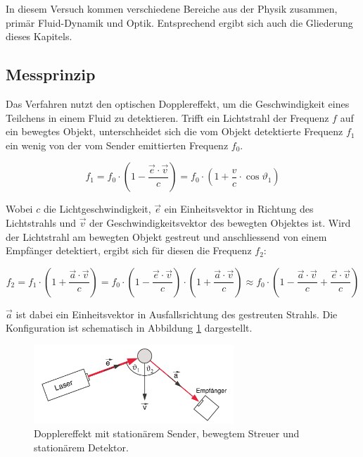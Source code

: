 In  diesem  Versuch kommen  verschiedene  Bereiche  aus der  Physik  zusammen,
prim\"ar Fluid-Dynamik und Optik. Entsprechend ergibt sich auch die Gliederung
dieses Kapitels.

\subsection{Messprinzip}
\label{subsec:messprinzip}

Das Verfahren nutzt den optischen  Dopplereffekt, um die Geschwindigkeit eines
Teilchens in einem  Fluid zu detektieren. Trifft ein  Lichtstrahl der Frequenz
$f$ auf  ein bewegtes Objekt,  unterschheidet sich die vom  Objekt detektierte
Frequenz $f_1$ ein wenig von der vom Sender emittierten Frequenz $f_0$.

\begin{equation}
    \label{eq:doppler}
    f_1 = f_0 \cdot \left( 1 - \frac{\vec{e} \cdot \vec{v}}{c} \right)
        = f_0 \cdot \left( 1 + \frac{v}{c} \cdot \cos{\vartheta_1} \right)
\end{equation}

Wobei $c$  die Lichtgeschwindigkeit, $\vec{e}$ ein  Einheitsvektor in Richtung
des  Lichtstrahls  und  $\vec{v}$   der  Geschwindigkeitsvektor  des  bewegten
Objektes ist. Wird der Lichtstrahl am bewegten Objekt gestreut und anschliessend
von einem Empf\"anger detektiert, ergibt sich f\"ur diesen die Frequenz $f_2$:

\begin{equation}
    \label{eq:doppler:gestreut}
    f_2
        = f_1 \cdot \left( 1 + \frac{\vec{a} \cdot \vec{v}}{c} \right)
        = f_0 \cdot \left( 1 - \frac{\vec{e} \cdot \vec{v}}{c} \right)
              \cdot \left( 1 + \frac{\vec{a} \cdot \vec{v}}{c} \right)
        \approx
        f_0 \cdot
        \left(
            1
            -
            \frac{\vec{a} \cdot \vec{v}}{c}
            +
            \frac{\vec{e} \cdot \vec{v}}{c}
        \right)
\end{equation}

$\vec{a}$   ist    dabei   ein   Einheitsvektor   in    Ausfallsrichtung   des
gestreuten   Strahls. Die   Konfiguration   ist   schematisch   in   Abbildung
\ref{fig:dopplereffekt} dargestellt.

\begin{figure}[h!t]
    \centering
    \includegraphics[width=0.67\textwidth]{images/doppler-effekt.png}
    \caption{%
        Dopplereffekt   mit  station\"arem   Sender,   bewegtem  Streuer   und
        station\"arem Detektor. \quelleVA
    }
    \label{fig:dopplereffekt}
\end{figure}

